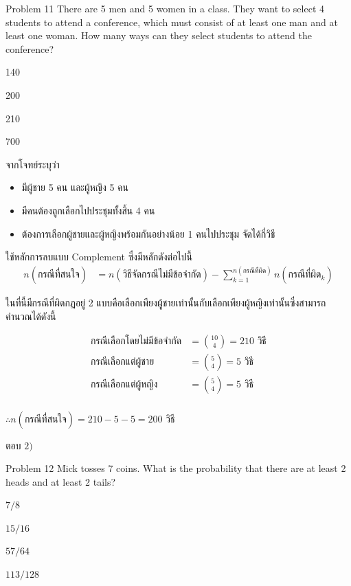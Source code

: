 \documentclass[11pt]{scrartcl}
\renewcommand{\binom}[2]{\genfrac{(}{)}{0pt}{0}{#1}{#2}}
\begin{document}
\begin{problembox}{Problem 11}
There are 5 men and 5 women in a class. They want to select 4 students to attend a conference, which must consist of at least one man and at least one woman. How many ways can they select students to attend the conference?
 
\begin{choices}
\item 140
\item 200
\item 210
\item 700
\end{choices}
\end{problembox}

\begin{solutionbox}
  จากโจทย์ระบุว่า
  \begin{itemize}
    \item มีผู้ชาย 5 คน และผู้หญิง 5 คน
    \item มีคนต้องถูกเลือกไปประชุมทั้งสิ้น 4 คน
    \item ต้องการเลือกผู้ชายและผู้หญิงพร้อมกันอย่างน้อย 1 คนไปประชุม จัดได้กี่วิธี
  \end{itemize}
  ใช้หลักการลบแบบ Complement ซึ่งมีหลักดังต่อไปนี้
  \begin{align*}
    n(\text{กรณีที่สนใจ}) &= n(\text{วิธีจัดกรณีไม่มีข้อจำกัด}) - \sum_{k=1}^{n(\text{กรณีที่ผิด})} n(\text{กรณีที่ผิด}_k)
  \end{align*}

  ในที่นี้มีกรณีที่ผิดกฏอยู่ 2 แบบคือเลือกเพียงผู้ชายเท่านั้นกับเลือกเพียงผู้หญิงเท่านั้นซึ่งสามารถคำนวณได้ดังนี้

  \begin{align*}
    \text{กรณีเลือกโดยไม่มีข้อจำกัด} &= \binom{10}{4} = 210 \text{ วิธี} \\
    \text{กรณีเลือกแต่ผู้ชาย} &= \binom{5}{4} = 5 \text{ วิธี} \\
    \text{กรณีเลือกแต่ผู้หญิง} &= \binom{5}{4} = 5 \text{ วิธี} \\
  \end{align*}

  $\therefore n(\text{กรณีที่สนใจ}) = 210 - 5 - 5 = 200 \text{ วิธี}$

  ตอบ $\boxed{2)}$
\end{solutionbox}

\newpage

\begin{problembox}{Problem 12}
Mick tosses 7 coins. What is the probability that there are at least 2 heads and at least 2 tails?
 
\begin{choices}
\item $7/8$
\item $15/16$
\item $57/64$
\item $113/128$
\end{choices}
\end{problembox}
\end{document}
